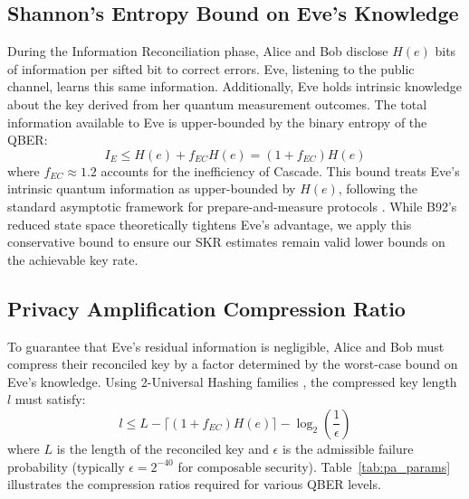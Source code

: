 \documentclass[conference]{IEEEtran}
\begin{document}
\subsection{Shannon's Entropy Bound on Eve's Knowledge}
During the Information Reconciliation phase, Alice and Bob disclose $H(e)$ bits of information per sifted bit to correct errors. Eve, listening to the public channel, learns this same information. Additionally, Eve holds intrinsic knowledge about the key derived from her quantum measurement outcomes. The total information available to Eve is upper-bounded by the binary entropy of the QBER:
\begin{equation}
I_E \leq H(e) + f_{EC} H(e) = (1 + f_{EC}) H(e)
\end{equation}
where $f_{EC} \approx 1.2$ accounts for the inefficiency of Cascade. This bound treats Eve's intrinsic quantum information as upper-bounded by $H(e)$, following the standard asymptotic framework for prepare-and-measure protocols \cite{scarani2009security}. While B92's reduced state space theoretically tightens Eve's advantage, we apply this conservative bound to ensure our SKR estimates remain valid lower bounds on the achievable key rate.


\subsection{Privacy Amplification Compression Ratio}
To guarantee that Eve's residual information is negligible, Alice and Bob must compress their reconciled key by a factor determined by the worst-case bound on Eve's knowledge. Using 2-Universal Hashing families \cite{ben1997random}, the compressed key length $l$ must satisfy:
\begin{equation}
l \leq L - \lceil (1 + f_{EC}) H(e) \rceil - \log_2\left(\frac{1}{\epsilon}\right)
\end{equation}
where $L$ is the length of the reconciled key and $\epsilon$ is the admissible failure probability (typically $\epsilon = 2^{-40}$ for composable security). Table~\ref{tab:pa_params} illustrates the compression ratios required for various QBER levels.



\begin{table}[htbp]
\caption{Privacy Amplification Parameters for B92}
\label{tab:pa_params}
\centering
\small
{}
\end{table}
\end{document}

